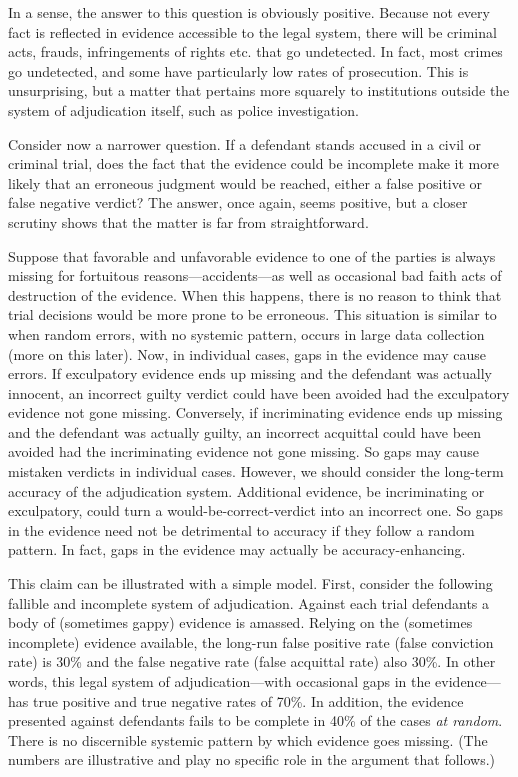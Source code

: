 \documentclass[
  10pt,
  dvipsnames,enabledeprecatedfontcommands]{scrartcl}
\begin{document}
In a sense, the answer to this question is obviously positive. Because
not every fact is reflected in evidence accessible to the legal system,
there will be criminal acts, frauds, infringements of rights etc. that
go undetected. In fact, most crimes go undetected, and some have
particularly low rates of prosecution. This is unsurprising, but a
matter that pertains more squarely to institutions outside the system of
adjudication itself, such as police investigation.

Consider now a narrower question. If a defendant stands accused in a
civil or criminal trial, does the fact that the evidence could be
incomplete make it more likely that an erroneous judgment would be
reached, either a false positive or false negative verdict? The answer,
once again, seems positive, but a closer scrutiny shows that the matter
is far from straightforward.

Suppose that favorable and unfavorable evidence to one of the parties is
always missing for fortuitous reasons---accidents---as well as
occasional bad faith acts of destruction of the evidence. When this
happens, there is no reason to think that trial decisions would be more
prone to be erroneous. This situation is similar to when random errors,
with no systemic pattern, occurs in large data collection (more on this
later). Now, in individual cases, gaps in the evidence may cause errors.
If exculpatory evidence ends up missing and the defendant was actually
innocent, an incorrect guilty verdict could have been avoided had the
exculpatory evidence not gone missing. Conversely, if incriminating
evidence ends up missing and the defendant was actually guilty, an
incorrect acquittal could have been avoided had the incriminating
evidence not gone missing. So gaps may cause mistaken verdicts in
individual cases. However, we should consider the long-term accuracy of
the adjudication system. Additional evidence, be incriminating or
exculpatory, could turn a would-be-correct-verdict into an incorrect
one. So gaps in the evidence need not be detrimental to accuracy if they
follow a random pattern. In fact, gaps in the evidence may actually be
accuracy-enhancing.

This claim can be illustrated with a simple model. First, consider the
following fallible and incomplete system of adjudication. Against each
trial defendants a body of (sometimes gappy) evidence is amassed.
Relying on the (sometimes incomplete) evidence available, the long-run
false positive rate (false conviction rate) is 30\% and the false
negative rate (false acquittal rate) also 30\%. In other words, this
legal system of adjudication---with occasional gaps in the
evidence---has true positive and true negative rates of 70\%. In
addition, the evidence presented against defendants fails to be complete
in 40\% of the cases \emph{at random}. There is no discernible systemic
pattern by which evidence goes missing. (The numbers are illustrative
and play no specific role in the argument that follows.)
\end{document}
